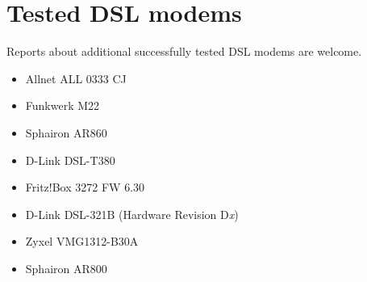 \section{Tested DSL modems}
  Reports about additional successfully tested DSL modems are welcome.
  
\begin{itemize}
\item Allnet ALL 0333 CJ
\end{itemize}

\begin{itemize}
\item Funkwerk M22
\item Sphairon AR860
\item D-Link DSL-T380
\end{itemize}

\begin{itemize}
\item Fritz!Box 3272 FW 6.30
\end{itemize}

\begin{itemize}
\item D-Link DSL-321B
(Hardware Revision D\emph{x})
\item Zyxel VMG1312-B30A
\end{itemize}

\begin{itemize}
\item Sphairon AR800
\end{itemize}

